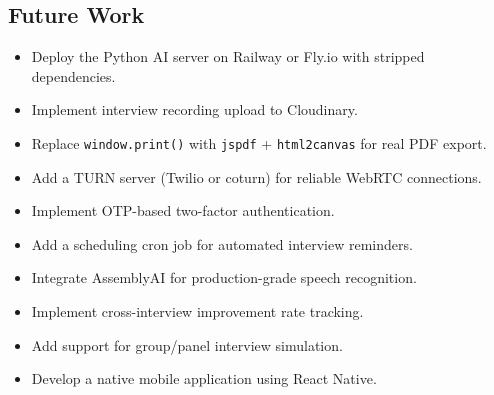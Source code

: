 \subsection{Future Work}

\begin{itemize}
    \item Deploy the Python AI server on Railway or Fly.io with stripped dependencies.
    \item Implement interview recording upload to Cloudinary.
    \item Replace \texttt{window.print()} with \texttt{jspdf} + \texttt{html2canvas} for real PDF export.
    \item Add a TURN server (Twilio or coturn) for reliable WebRTC connections.
    \item Implement OTP-based two-factor authentication.
    \item Add a scheduling cron job for automated interview reminders.
    \item Integrate AssemblyAI for production-grade speech recognition.
    \item Implement cross-interview improvement rate tracking.
    \item Add support for group/panel interview simulation.
    \item Develop a native mobile application using React Native.
\end{itemize}
